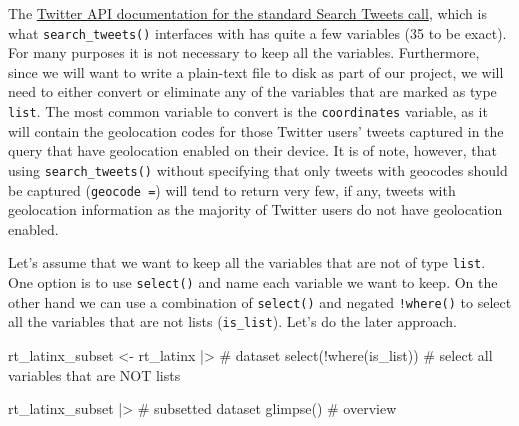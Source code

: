 \documentclass[
  letterpaper,
]{latex/krantz}
\newenvironment{Shaded}{\begin{snugshade}}{\end{snugshade}}
\newcommand{\CommentTok}[1]{\textcolor[rgb]{0.37,0.37,0.37}{#1}}
\newcommand{\FunctionTok}[1]{\textcolor[rgb]{0.28,0.35,0.67}{#1}}
\newcommand{\NormalTok}[1]{\textcolor[rgb]{0.00,0.23,0.31}{#1}}
\newcommand{\OtherTok}[1]{\textcolor[rgb]{0.00,0.23,0.31}{#1}}
\newcommand{\SpecialCharTok}[1]{\textcolor[rgb]{0.37,0.37,0.37}{#1}}
\begin{document}
The
\href{https://developer.twitter.com/en/docs/twitter-api/v1/tweets/search/api-reference/get-search-tweets}{Twitter
API documentation for the standard Search Tweets call}, which is what
\texttt{search\_tweets()} interfaces with has quite a few variables (35
to be exact). For many purposes it is not necessary to keep all the
variables. Furthermore, since we will want to write a plain-text file to
disk as part of our project, we will need to either convert or eliminate
any of the variables that are marked as type \texttt{list}. The most
common variable to convert is the \texttt{coordinates} variable, as it
will contain the geolocation codes for those Twitter users' tweets
captured in the query that have geolocation enabled on their device. It
is of note, however, that using \texttt{search\_tweets()} without
specifying that only tweets with geocodes should be captured
(\texttt{geocode\ =}) will tend to return very few, if any, tweets with
geolocation information as the majority of Twitter users do not have
geolocation enabled.

Let's assume that we want to keep all the variables that are not of type
\texttt{list}. One option is to use \texttt{select()} and name each
variable we want to keep. On the other hand we can use a combination of
\texttt{select()} and negated \texttt{!where()} to select all the
variables that are not lists (\texttt{is\_list}). Let's do the later
approach.

\begin{Shaded}
\begin{Highlighting}[]
\NormalTok{rt\_latinx\_subset }\OtherTok{\textless{}{-}} 
\NormalTok{  rt\_latinx }\SpecialCharTok{|\textgreater{}} \CommentTok{\# dataset}
  \FunctionTok{select}\NormalTok{(}\SpecialCharTok{!}\FunctionTok{where}\NormalTok{(is\_list))  }\CommentTok{\# select all variables that are NOT lists}

\NormalTok{rt\_latinx\_subset }\SpecialCharTok{|\textgreater{}} \CommentTok{\# subsetted dataset}
  \FunctionTok{glimpse}\NormalTok{() }\CommentTok{\# overview}
\end{Highlighting}
\end{Shaded}
\end{document}
